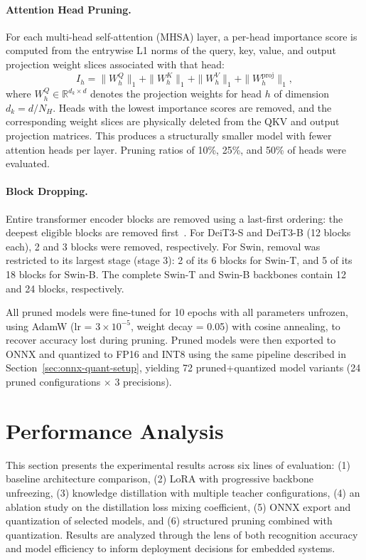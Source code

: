 \documentclass[runningheads,a4paper]{llncs}
\begin{document}
\paragraph{Attention Head Pruning.}
For each multi-head self-attention (MHSA) layer, a per-head importance score is computed from the entrywise L1 norms of the query, key, value, and output projection weight slices associated with that head:
\[
    I_h = \|W^Q_h\|_1 + \|W^K_h\|_1 + \|W^V_h\|_1 + \|W^{\text{proj}}_h\|_1,
\]
where $W^Q_h \in \mathbb{R}^{d_k \times d}$ denotes the projection weights for head $h$ of dimension $d_k = d/N_H$. Heads with the lowest importance scores are removed, and the corresponding weight slices are physically deleted from the QKV and output projection matrices. This produces a structurally smaller model with fewer attention heads per layer. Pruning ratios of 10\%, 25\%, and 50\% of heads were evaluated.

\paragraph{Block Dropping.}
Entire transformer encoder blocks are removed using a last-first ordering: the deepest eligible blocks are removed first~\cite{Park2023PTPrune}. For DeiT3-S and DeiT3-B (12 blocks each), 2 and 3 blocks were removed, respectively. For Swin, removal was restricted to its largest stage (stage 3): 2 of its 6 blocks for Swin-T, and 5 of its 18 blocks for Swin-B. The complete Swin-T and Swin-B backbones contain 12 and 24 blocks, respectively.

All pruned models were fine-tuned for 10 epochs with all parameters unfrozen, using AdamW (lr = $3 \times 10^{-5}$, weight decay = 0.05) with cosine annealing, to recover accuracy lost during pruning. Pruned models were then exported to ONNX and quantized to FP16 and INT8 using the same pipeline described in Section~\ref{sec:onnx-quant-setup}, yielding 72 pruned+quantized model variants (24 pruned configurations $\times$ 3 precisions).

\section{Performance Analysis}\label{sec:performance}
This section presents the experimental results across six lines of evaluation: (1) baseline architecture comparison, (2) LoRA with progressive backbone unfreezing, (3) knowledge distillation with multiple teacher configurations, (4) an ablation study on the distillation loss mixing coefficient, (5) ONNX export and quantization of selected models, and (6) structured pruning combined with quantization. Results are analyzed through the lens of both recognition accuracy and model efficiency to inform deployment decisions for embedded systems.
\end{document}
